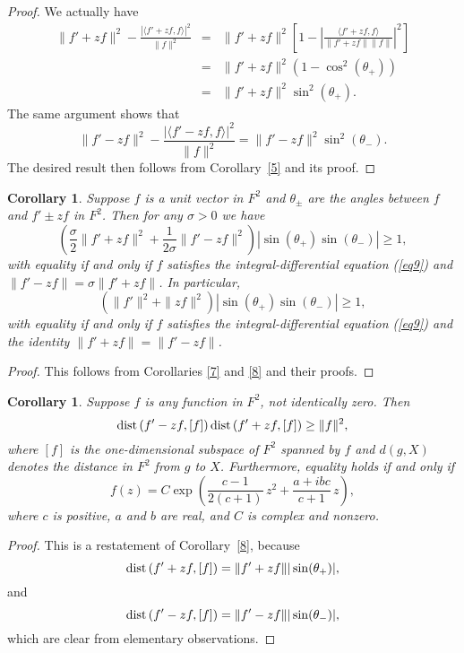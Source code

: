 \documentclass[12pt,reqno]{amsart}
\newtheorem{cor}[thm]{Corollary}
\begin{document}
\begin{proof}
We actually have
\begin{eqnarray*}
\|f'+zf\|^2-\frac{|\langle f'+zf,f\rangle|^2}{\|f\|^2}&=&\|f'+zf\|^2\left[1-\left|\frac{\langle f'+zf,f\rangle}
{\|f'+zf\|\|f\|}\right|^2\right]\\
&=&\|f'+zf\|^2(1-\cos^2(\theta_+))\\
&=&\|f'+zf\|^2\sin^2(\theta_+).
\end{eqnarray*}
The same argument shows that
$$\|f'-zf\|^2-\frac{|\langle f'-zf,f\rangle|^2}{\|f\|^2}=\|f'-zf\|^2\sin^2(\theta_-).$$
The desired result then follows from Corollary~\ref{5} and its proof.
\end{proof}

\begin{cor}
Suppose $f$ is a unit vector in $F^2$ and $\theta_{\pm}$ are the angles between $f$ and $f'\pm zf$ in $F^2$.
Then for any $\sigma>0$ we have
$$\left(\frac\sigma2\|f'+zf\|^2+\frac1{2\sigma}\|f'-zf\|^2\right)|\sin(\theta_+)\sin(\theta_-)|\ge1,$$
with equality if and only if $f$ satisfies the integral-differential equation (\ref{eq9}) and
$\|f'-zf\|=\sigma\|f'+zf\|$. In particular,
$$(\|f'\|^2+\|zf\|^2)|\sin(\theta_+)\sin(\theta_-)|\ge1,$$
with equality if and only if $f$ satisfies the integral-differential equation (\ref{eq9}) and the identity
$\|f'+zf\|=\|f'-zf\|$.
\label{9}
\end{cor}

\begin{proof}
This follows from Corollaries \ref{7} and \ref{8} and their proofs.
\end{proof}

\begin{cor}
Suppose $f$ is any function in $F^2$, not identically zero. Then
$${{\rm dist}\,}(f'-zf,[f])\,{{\rm dist}\,}(f'+zf,[f])\ge\|f\|^2,$$
where $[f]$ is the one-dimensional subspace of $F^2$ spanned by $f$ and $d(g,X)$ denotes the distance
in $F^2$ from $g$ to $X$. Furthermore, equality holds if and only if
$$f(z)=C\exp\left(\frac{c-1}{2(c+1)}\,z^2+\frac{a+ibc}{c+1}\,z\right),$$
where $c$ is positive, $a$ and $b$ are real, and $C$ is complex and nonzero.
\label{10}
\end{cor}

\begin{proof}
This is a restatement of Corollary~\ref{8}, because
$${{\rm dist}\,}(f'+zf,[f])=\|f'+zf\||\sin(\theta_+)|,$$
and
$${{\rm dist}\,}(f'-zf,[f])=\|f'-zf\||\sin(\theta_-)|,$$
which are clear from elementary observations.
\end{proof}
\end{document}
